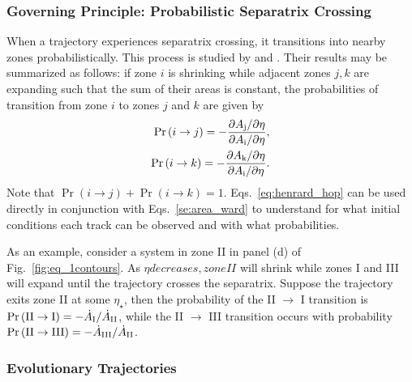 \documentclass[
        fleqn,
        usenatbib,
    ]{mnras}
\newcommand*{\pdil}[2]{\partial#1 / \partial#2}
\newcommand*{\p}[1]{\left(#1\right)}
\begin{document}
\subsubsection{Governing Principle: Probabilistic Separatrix Crossing}

When a trajectory experiences separatrix crossing, it transitions into nearby
zones probabilistically. This process is studied by \citet{henrard1982} and
\citet{henrard1987}. Their results may be summarized as follows: if zone $i$
is shrinking while adjacent zones $j, k$ are expanding such that the sum of
their areas is constant, the probabilities of transition from zone $i$ to zones
$j$ and $k$ are given by
\begin{subequations}\label{eq:henrard_hop}
    \begin{align}
        \Pr\p{i \to j} = -\frac{\pdil{A_{\rm j}}{\eta}}{\pdil{A_{\rm i}}{\eta}},
                \\
        \Pr\p{i \to k} = -\frac{\pdil{A_{\rm k}}{\eta}}{\pdil{A_{\rm i}}{\eta}}.
    \end{align}
\end{subequations}
Note that $\Pr \p{i \to j} + \Pr\p{i \to k} = 1$.
Eqs.~\eqref{eq:henrard_hop} can be used directly in conjunction with
Eqs.~\eqref{se:area_ward} to understand for what initial conditions each track
can be observed and with what probabilities.

As an example, consider a system in zone II in panel (d) of
Fig.~\ref{fig:eq_1contours}. As $\eta decreases, zone II$ will shrink while
zones I and III will expand until the trajectory crosses the separatrix. Suppose
the trajectory exits zone II at some $\eta_\star$, then the probability of the
II $\to$ I transition is $\Pr\p{\rm II \to I} = -\dot{A}_{\rm I} / \dot{A}_{\rm
II}$, while the II $\to$ III transition occurs with probability $\Pr\p{\rm II
\to III} = -\dot{A}_{\rm III} / \dot{A}_{\rm II}$.

\subsubsection{Evolutionary Trajectories}\label{sss:evol_traj}
\end{document}
